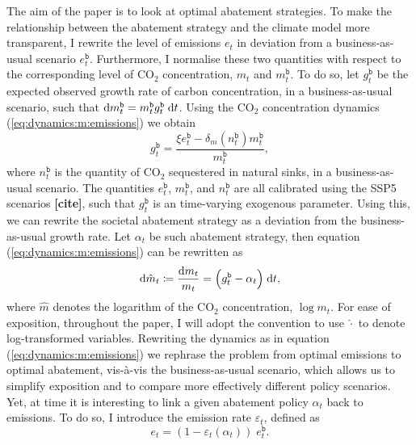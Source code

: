 \documentclass[../../main.tex]{subfiles}
\begin{document}
The aim of the paper is to look at optimal abatement strategies. To make the relationship between the abatement strategy and the climate model more transparent, I rewrite the level of emissions $e_t$ in deviation from a business-as-usual scenario $e^{\mathtt{b}}_t$. Furthermore, I normalise these two quantities with respect to the corresponding level of CO$_2$ concentration, $m_t$ and $m^{\mathtt{b}}_t$. To do so, let $g^{\mathtt{b}}_t$ be the expected observed growth rate of carbon concentration, in a business-as-usual scenario, such that $\mathrm{d}m^{\mathtt{b}}_t = m^{\mathtt{b}}_t g^{\mathtt{b}}_t \; \mathrm{d}t$. Using the CO$_2$ concentration dynamics (\ref{eq:dynamics:m:emissions}) we obtain \begin{equation} \label{eq:growth-rate-bau}
    g^{\mathtt{b}}_t = \frac{\xi e^{\mathtt{b}}_t - \delta_m(n^{\mathtt{b}}_t) m^{\mathtt{b}}_t}{m^{\mathtt{b}}_t},
\end{equation} where $n^{\mathtt{b}}_t$ is the quantity of CO$_2$ sequestered in natural sinks, in a business-as-usual scenario. The quantities $e^{\mathtt{b}}_t$, $m^{\mathtt{b}}_t$, and $n^{\mathtt{b}}_t$ are all calibrated using the SSP5 scenarios \textbf{[cite]}, such that $g^{\mathtt{b}}_t$ is an time-varying exogenous parameter. Using this, we can rewrite the societal abatement strategy as a deviation from the business-as-usual growth rate. Let $\alpha_t$ be such abatement strategy, then equation (\ref{eq:dynamics:m:emissions}) can be rewritten as \begin{equation} \label{eq:dynamics:m:abatement}
    \mathrm{d}\hat m_t \coloneqq \frac{\mathrm{d}m_t}{m_t} = \Big( g^{\mathtt{b}}_t - \alpha_t \Big)\; \mathrm{d}t,
\end{equation} where $\hat m$ denotes the logarithm of the CO$_2$ concentration, $\log m_t$. For ease of exposition, throughout the paper, I will adopt the convention to use $\hat \cdot$ to denote log-transformed variables. Rewriting the dynamics as in equation (\ref{eq:dynamics:m:emissions}) we rephrase the problem from optimal emissions to optimal abatement, vis-à-vis the business-as-usual scenario, which allows us to simplify exposition and to compare more effectively different policy scenarios. Yet, at time it is interesting to link a given abatement policy $\alpha_t$ back to emissions. To do so, I introduce the emission rate $\varepsilon_t$, defined as \begin{equation}
    e_t = (1 - \varepsilon_t(\alpha_t)) \; e^{\mathtt{b}}_t.
\end{equation}
\end{document}
